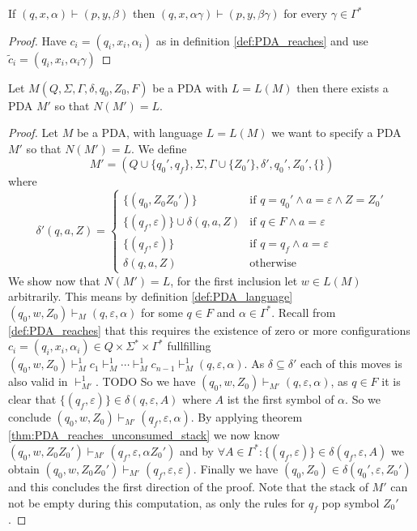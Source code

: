 \begin{theorem}\label{thm:PDA_reaches_unconsumed_stack}
  If $(q,x,\alpha)\vdash(p,y,\beta)$ then $(q,x,\alpha\gamma)\vdash(p,y,\beta\gamma)$ for
  every $\gamma\in\Gamma^*$
\end{theorem}
\begin{proof}
  Have $c_i = (q_i,x_i,\alpha_i)$ as in definition \ref{def:PDA_reaches} and use
  $\tilde{c}_i = (q_i,x_i,\alpha_i\gamma)$
\end{proof}
\begin{theorem}\label{thm:PDA_empty_stack_of_final_state}
  Let $M(Q,\Sigma,\Gamma,\delta,q_0,Z_0,F)$ be a PDA with $L=L(M)$ then there exists a PDA $M'$ so that $N(M')=L.$
\end{theorem}
\begin{proof}
  Let $M$ be a PDA, with language $L=L(M)$ we want to specify a PDA $M'$ so that
  $N(M')=L$. We define
  \[
  M' =(Q\cup\{q_0',q_f\},\Sigma,\Gamma\cup\{Z_0'\},\delta',q_0',Z_0',\{\})
  \]
  where
  \[
  \delta'(q,a,Z) =
  \begin{cases}
    \{(q_0,Z_0Z_0')\} & \text{if } q=q_0'\land a=\varepsilon \land Z=Z_0' \\
    \{(q_f,\varepsilon)\}\cup\delta(q,a,Z)  & \text{if } q\in F\land a=\varepsilon \\
    \{(q_f,\varepsilon)\} & \text{if } q=q_f \land a=\varepsilon \\
    \delta(q,a,Z) & \text{otherwise}
  \end{cases}
  \]
  We show now that $N(M')=L$, for the first inclusion let $w\in L(M)$ arbitrarily.
  This means by definition
  \ref{def:PDA_language} $(q_0,w,Z_0)\vdash_M(q,\varepsilon,\alpha)$ for some $q\in F$ and
  $\alpha\in\Gamma^*$. Recall from \ref{def:PDA_reaches} that this requires the existence
  of zero or more configurations $c_i=(q_i,x_i,\alpha_i)\in Q\times\Sigma^*\times\Gamma^*$
  fullfilling
  $(q_0,w,Z_0)\vdash^1_M c_1\vdash^1_M\cdots\vdash^1_M c_{n-1}\vdash^1_M(q,\varepsilon,\alpha)$.
  As $\delta\subseteq\delta'$ each of this moves is also valid in $\vdash^1_{M'}$. TODO
  So we have $(q_0,w,Z_0)\vdash_{M'}(q,\varepsilon,\alpha)$, as $q\in F$ it is clear that
  $\{(q_f,\varepsilon)\}\in \delta(q,\varepsilon,A)$ where $A$ ist the first symbol of $\alpha$.
  So we conclude  $(q_0,w,Z_0)\vdash_{M'}(q_f,\varepsilon,\alpha)$.
  By applying theorem \ref{thm:PDA_reaches_unconsumed_stack} we now know
  $(q_0,w,Z_0Z_0')\vdash_{M'}(q_f,\varepsilon,\alpha Z_0')$
  and by $\forall A\in\Gamma^*:\{(q_f,\varepsilon)\}\in\delta(q_f,\varepsilon,A)$ we obtain
  $(q_0,w,Z_0Z_0')\vdash_{M'}(q_f,\varepsilon,\varepsilon)$. Finally we have
  $(q_0,Z_0)\in\delta(q_0',\varepsilon,Z_0')$ and this concludes the first direction of
  the proof. Note that the stack of $M'$ can not be empty during this computation, as only the rules
  for $q_f$ pop symbol $Z_0'$.




\end{proof}


